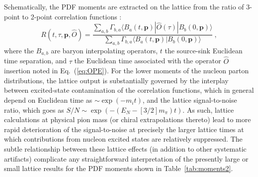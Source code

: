 Schematically, the PDF moments are extracted on the lattice from the ratio of 3-point to 2-point correlation functions
\cite{Gockeler:1995wg,Lin:2017snn}:
\begin{equation}
	R(t,\tau,\mathbf{p},\hat{O}) = \frac{\sum_{a,b} \Gamma_{b,a} \langle B_a(t,\mathbf{p}) | \hat{O}(\tau) |
	B_b(0,\mathbf{p}) \rangle}{\sum_{a,b} \Gamma_{b,a} \langle B_a(t,\mathbf{p}) | B_b(0,\mathbf{p}) \rangle}\ ,
\end{equation}
where the $B_{a,b}$ are baryon interpolating operators, $t$ the source-sink Euclidean time separation, and $\tau$ the Euclidean
time associated with the operator $\hat{O}$ insertion noted in Eq.~(\ref{eq:OPE}). For the lower moments of the nucleon
parton distributions, the lattice output is substantially governed by the interplay between excited-state contamination
of the correlation functions, which in general depend on Euclidean time as $\sim\! \exp{(-m_i t)}$, and the lattice signal-to-noise
ratio, which goes as $S/N\! \sim\! \exp{(-(E_N -[3/2]m_\pi) t)}$. As such, lattice calculations at physical pion mass (or chiral
extrapolations thereto) lead to more rapid deterioration of the signal-to-noise at precisely the larger lattice times at
which contributions from nucleon excited states are relatively suppressed. The subtle relationship between these lattice effects
(in addition to other systematic artifacts) complicate any straightforward interpretation of the presently large or small
lattice results for the PDF moments shown in Table~\ref{tab:moments2}.



\clearpage

